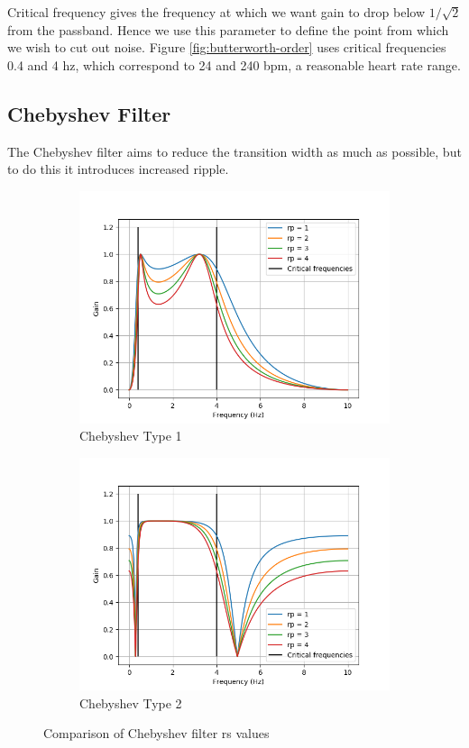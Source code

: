 \documentclass[12pt,a4paper,twoside,openright]{report}
\begin{document}
Critical frequency gives the frequency at which we want gain to drop below
\(1/\sqrt2\) from the passband. Hence we use this parameter to define the
point from which we wish to cut out noise. Figure \ref{fig:butterworth-order}
uses critical frequencies 0.4 and 4 hz, which correspond to 24 and 240 bpm, a
reasonable heart rate range.

\subsection{Chebyshev Filter}

The Chebyshev filter aims to reduce the transition width as much as possible,
but to do this it introduces increased ripple.

\begin{figure}[h]
\begin{subfigure}{.5\textwidth}
  \centering
  \includegraphics[width=\linewidth]{figs/cheby1-rp-comparison.png}
  \caption{Chebyshev Type 1}
  \label{fig:cheby1rs}
\end{subfigure}%
\begin{subfigure}{.5\textwidth}
  \centering
  \includegraphics[width=\linewidth]{figs/cheby2-rp-comparison.png}
  \caption{Chebyshev Type 2}
  \label{fig:cheby2rs}
\end{subfigure}
\caption{Comparison of Chebyshev filter rs values}
\label{fig:chebyrs}
\end{figure}
\end{document}
